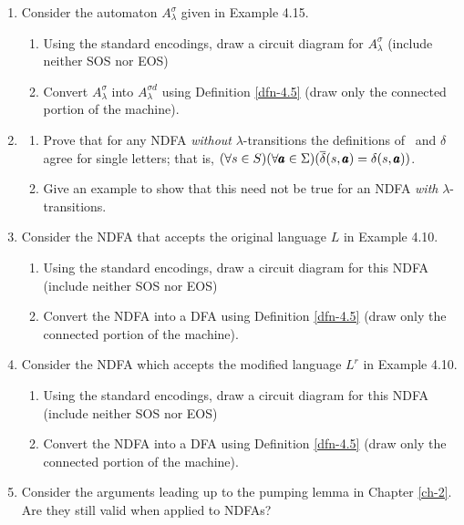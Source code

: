\begin{enumerate}[{4.}1.]
\item Consider the automaton $A^{\sigma}_{\lambda}$ given in Example 4.15.
\begin{enumerate}
\item Using the standard encodings, draw a circuit diagram for
$A^{\sigma}_{\lambda}$ (include neither \<SOS\> nor \<EOS\>)
\item Convert $A^{\sigma}_{\lambda}$ into $A^{\sigma d}_{\lambda}$ using
Definition \ref{dfn-4.5} (draw only the connected portion of the machine).
\end{enumerate}

\item \begin{enumerate}
\item Prove that for any NDFA \emph{without} $\lambda$-transitions the
definitions of \DBAR\ and $\delta$ agree for single letters; that is,
$(\forall s \in S)(\forall\pmb{a}\in\Sigma)(\overline{\delta}(s,\pmb{a})=\delta(s,\pmb{a}))$.
\item Give an example to show that this need not be true for an NDFA \emph{with}
$\lambda$-transitions.
\end{enumerate}

\item Consider the NDFA that accepts the original language $L$ in Example 4.10.
\begin{enumerate}
\item Using the standard encodings, draw a circuit diagram for this NDFA
(include neither \<SOS\> nor \<EOS\>)
\item Convert the NDFA into a DFA using Definition \ref{dfn-4.5} (draw only the connected
portion of the machine).
\end{enumerate}

\item Consider the NDFA which accepts the modified language $L^r$ in Example
4.10.
\begin{enumerate}
\item Using the standard encodings, draw a circuit diagram for this NDFA
(include neither \<SOS\> nor \<EOS\>)
\item Convert the NDFA into a DFA using Definition \ref{dfn-4.5} (draw only the connected
portion of the machine).
\end{enumerate}

\item Consider the arguments leading up to the pumping lemma in Chapter \ref{ch-2}. Are
they still valid when applied to NDFAs?


\end{enumerate}
